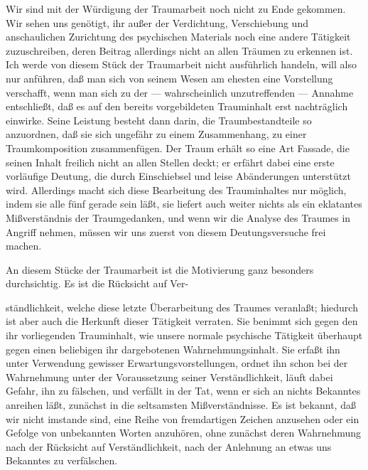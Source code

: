 \documentclass[twoside=true,titlepage=false,open=any, parskip=never, fontsize=10pt, headings=small, chapterprefix=false, appendixprefix=false]{scrbook}
\begin{document}
        \pstart
        Wir sind mit der Würdigung der Traumarbeit noch nicht zu Ende gekommen. Wir
               sehen uns genötigt, ihr außer der Verdichtung, Verschiebung und
               anschaulichen Zurichtung des psychischen Materials noch eine andere
               Tätigkeit zuzuschreiben, deren Beitrag allerdings nicht an allen Träumen zu
               erkennen ist. Ich werde von diesem Stück der Traumarbeit nicht ausführlich
               handeln, will also nur anführen, daß man sich von seinem Wesen am ehesten eine
               Vorstellung verschafft, wenn man sich zu der — wahrscheinlich unzutreffenden —
               Annahme entschließt, daß es auf den bereits vorgebildeten
                  Trauminhalt erst nachträglich einwirke. Seine Leistung besteht dann
               darin, die Traumbestandteile so anzuordnen, daß sie sich ungefähr zu einem
               Zusammenhang, zu einer Traumkomposition zusammenfügen. Der Traum
               erhält so eine Art Fassade, die seinen Inhalt freilich nicht an allen Stellen
               deckt; er erfährt dabei eine erste vorläufige Deutung, die durch Einschiebsel
               und leise Abänderungen unterstützt wird. Allerdings macht sich diese Bearbeitung
               des Trauminhaltes nur möglich, indem sie alle fünf gerade sein läßt, sie
               liefert auch weiter nichts als ein eklatantes Mißverständnis der Traumgedanken,
               und wenn wir die Analyse des Traumes in Angriff nehmen, müssen wir uns zuerst
               von diesem Deutungsversuche frei machen.
        \pend
    
            
        \pstart
        An diesem Stücke der Traumarbeit ist die Motivierung ganz besonders
               durchsichtig. Es ist die Rücksicht auf Ver-
        \pend
    
         
            
            
            
        \pstart
        ständlichkeit, welche diese letzte
               Überarbeitung des Traumes veranlaßt; hiedurch ist aber auch die Herkunft dieser
               Tätigkeit verraten. Sie benimmt sich gegen den ihr vorliegenden Trauminhalt, wie unsere normale psychische Tätigkeit überhaupt gegen
               einen beliebigen ihr dargebotenen Wahrnehmungsinhalt. Sie erfaßt ihn unter
               Verwendung gewisser Erwartungsvorstellungen, ordnet ihn schon bei der
               Wahrnehmung unter der Voraussetzung seiner Verständlichkeit, läuft dabei Gefahr,
               ihn zu fälschen, und verfällt in der Tat, wenn er sich an nichts Bekanntes
               anreihen läßt, zunächst in die seltsamsten Mißverständnisse. Es ist
               bekannt, daß wir nicht imstande sind, eine Reihe von fremdartigen Zeichen
               anzusehen oder ein Gefolge von unbekannten Worten anzuhören, ohne zunächst deren
               Wahrnehmung nach der Rücksicht auf Verständlichkeit,
               nach der Anlehnung an etwas uns Bekanntes zu verfälschen.
        \pend
    
\end{document}
